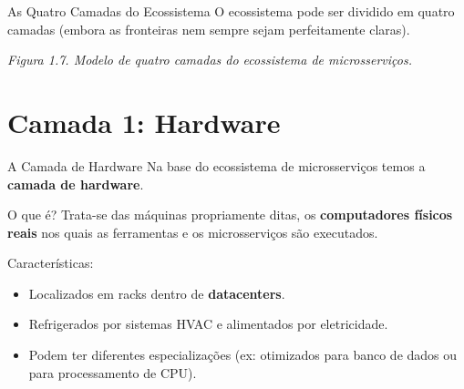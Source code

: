 \documentclass[aspectratio=169]{beamer}
\begin{document}
\begin{frame}{As Quatro Camadas do Ecossistema}
    O ecossistema pode ser dividido em quatro camadas (embora as fronteiras nem sempre sejam perfeitamente claras).
    \vspace{0.4cm}
    \begin{center}
    \end{center}
    \vspace{0.2cm}
    \centering
    \textit{Figura 1.7. Modelo de quatro camadas do ecossistema de microsserviços.}
\end{frame}

\section{Camada 1: Hardware}

\begin{frame}{A Camada de Hardware}
    Na base do ecossistema de microsserviços temos a \textbf{camada de hardware}.
    \vspace{0.4cm}
    \begin{block}{O que é?}
        Trata-se das máquinas propriamente ditas, os \textbf{computadores físicos reais} nos quais as ferramentas e os microsserviços são executados.
    \end{block}
    \vspace{0.3cm}
    Características:
    \begin{itemize}
        \item Localizados em racks dentro de \textbf{datacenters}.
        \item Refrigerados por sistemas HVAC e alimentados por eletricidade.
        \item Podem ter diferentes especializações (ex: otimizados para banco de dados ou para processamento de CPU).
    \end{itemize}
\end{frame}
\end{document}
